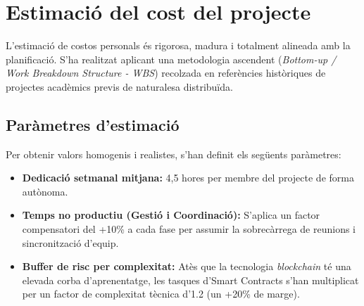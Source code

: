 \documentclass[12pt,a4paper]{article}
\begin{document}
\section{Estimació del cost del projecte}

L'estimació de costos personals és rigorosa, madura i totalment alineada amb la planificació. S'ha realitzat aplicant una metodologia ascendent (\textit{Bottom-up / Work Breakdown Structure - WBS}) recolzada en referències històriques de projectes acadèmics previs de naturalesa distribuïda.

\subsection{Paràmetres d'estimació}
Per obtenir valors homogenis i realistes, s'han definit els següents paràmetres:
\begin{itemize}
    \item \textbf{Dedicació setmanal mitjana:} 4,5 hores per membre del projecte de forma autònoma.
    \item \textbf{Temps no productiu (Gestió i Coordinació):} S'aplica un factor compensatori del +10\% a cada fase per assumir la sobrecàrrega de reunions i sincronització d'equip.
    \item \textbf{Buffer de risc per complexitat:} Atès que la tecnologia \textit{blockchain} té una elevada corba d'aprenentatge, les tasques d'Smart Contracts s'han multiplicat per un factor de complexitat tècnica d'1.2 (un +20\% de marge).
\end{itemize}
\end{document}
